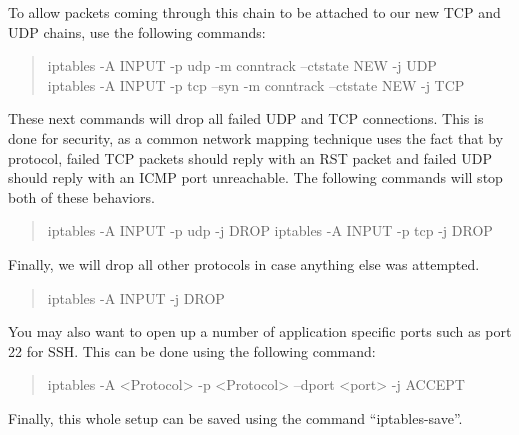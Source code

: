 \documentclass[a4paper,11pt]{report}
\begin{document}
						To allow packets coming through this chain to be attached to our new TCP and UDP chains, use the following commands:
						\begin{quote}
							iptables -A INPUT -p udp -m conntrack --ctstate NEW -j UDP \\
							iptables -A INPUT -p tcp --syn -m conntrack --ctstate NEW -j TCP \\
						\end{quote}
						These next commands will drop all failed UDP and TCP connections. 
						This is done for security, as a common network mapping technique uses the fact that by protocol, failed TCP packets should reply with an RST packet and failed UDP should reply with an ICMP port unreachable. 
						The following commands will stop both of these behaviors. 
						\begin{quote}
							iptables -A INPUT -p udp -j DROP
							iptables -A INPUT -p tcp -j DROP
						\end{quote}
						Finally, we will drop all other protocols in case anything else was attempted. 
						\begin{quote}
							iptables -A INPUT -j DROP
						\end{quote}
						You may also want to open up a number of application specific ports such as port 22 for SSH. 
						This can be done using the following command:
						\begin{quote}
							iptables -A <Protocol> -p <Protocol> --dport <port> -j ACCEPT
						\end{quote}
						Finally, this whole setup can be saved using the command ``iptables-save''. 

		
\end{document}

